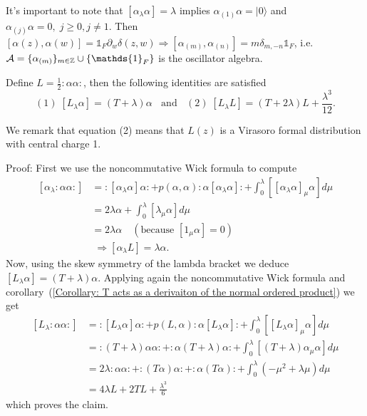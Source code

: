 It's important to note that $[\alpha_\lambda\alpha]=\lambda$ implies $\alpha_{(1)}\alpha = |0\rangle$ and $\alpha_{(j)}\alpha=0,\;j\geq0,j\neq1$. Then $[\alpha(z),\alpha(w)]=\mathds{1}_F\partial_w\delta(z,w)\Rightarrow [\alpha_{(m)},\alpha_{(n)}]=m\delta_{m,-n}\mathds{1}_F$, i.e. $\mathcal{A}=\{\alpha_{(m)}\}_{m\in\bb{Z}}\cup\{\mathds{1}_F\}$ is the oscillator algebra.
\begin{dang}
    \begin{lemma}\label{Lemma: action of L on alpha}
        Define $L=\frac{1}{2}:\alpha\alpha:$, then the following identities are satisfied
        \begin{equation}
        (1)\;[L_\lambda\alpha]=(T+\lambda)\alpha\;\;\text{ and }\;\;(2)\; [L_\lambda L]=(T+2\lambda)L+\frac{\lambda^3}{12}.
        \end{equation}
    \end{lemma}
\end{dang}
\begin{dang}
    \begin{remark}
      We remark that equation (2) means that $L(z)$ is a Virasoro formal distribution with central charge 1.
    \end{remark}
\end{dang}
Proof: First we use the noncommutative Wick formula to compute
\begin{equation}
\begin{split}
     [\alpha_\lambda :\alpha\alpha:] &= :[\alpha_\lambda\alpha]\alpha:+p(\alpha,\alpha):\alpha[\alpha_\lambda\alpha]:+\int_0^\lambda[[\alpha_\lambda\alpha]_\mu\alpha]d\mu\\
     &=2\lambda\alpha+\int_0^\lambda[\lambda_\mu\alpha]d\mu\\
     &=2\lambda\alpha\quad(\text{because } [1_\mu\alpha]=0)\\
     &\;\Rightarrow[\alpha_\lambda L]=\lambda \alpha.
\end{split}
\end{equation}
Now, using the skew symmetry of the lambda bracket we deduce $[L_\lambda\alpha]=(T+\lambda)\alpha$. Applying again the noncommutative Wick formula and corollary~(\ref{Corollary: T acts as a derivaiton of the normal ordered product}) we get
\begin{equation}
    \begin{split}
        [L_\lambda:\alpha\alpha:]&=:[L_\lambda\alpha]\alpha:+p(L,\alpha):\alpha[L_\lambda\alpha]:+\int_0^\lambda[[L_\lambda\alpha]_\mu\alpha]d\mu\\
        &=:(T+\lambda)\alpha\alpha:+:\alpha(T+\lambda)\alpha:+\int_0^\lambda[(T+\lambda)\alpha_\mu\alpha]d\mu\\
        &=2\lambda:\alpha\alpha:+:(T\alpha)\alpha:+:\alpha (T\alpha):+\int_0^\lambda(-\mu^2+\lambda\mu )d\mu\\
        &=4\lambda L+2TL+\frac{\lambda^3}{6}
    \end{split}
\end{equation}
which proves the claim.

